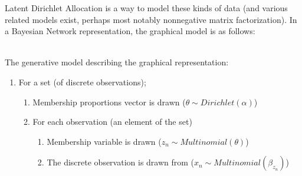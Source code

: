 \documentclass{article}%
\begin{document}
Latent Dirichlet Allocation \cite{blei2003lda} is a way to model these kinds of data (and various related models exist, perhaps most notably nonnegative matrix factorization\cite{cemgil2009nmf}). In a Bayesian Network representation, the graphical model is as follows:
\begin{figure}[h]
	\end{figure}
\\The generative model describing the graphical representation:
	\begin{enumerate}
		\item For a set (of discrete observations);
		\begin{enumerate}
			\item Membership proportions vector is drawn ($\theta \sim Dirichlet(\alpha)$)
			\item For each observation (an element of the set)
			\begin{enumerate}
				\item Membership variable is drawn ($z_n \sim Multinomial(\theta)$)
				\item The discrete observation is drawn from ($x_n \sim Multinomial(\beta_{z_n})$)
			\end{enumerate}
		\end{enumerate}
	\end{enumerate}
	
\end{document}
